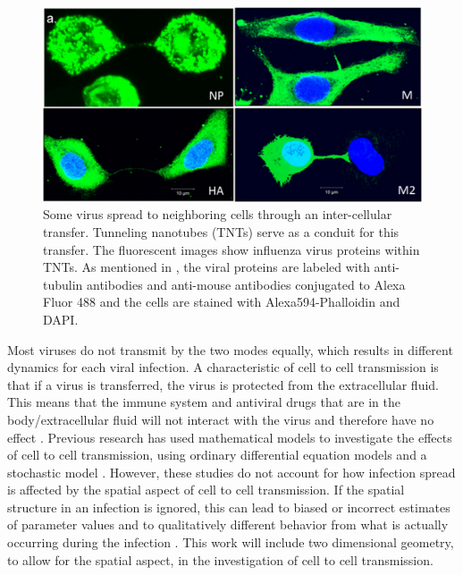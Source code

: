 \documentclass[a4paper]{article}
\begin{document}
\begin{figure}[h]
    \centering
    \includegraphics[width=0.8\linewidth]{Figures/cell2cell.pdf}
    \caption{Some virus spread to neighboring cells through an inter-cellular transfer. Tunneling nanotubes (TNTs) serve as a conduit for this transfer. The fluorescent images show influenza virus proteins within TNTs. As mentioned in \cite{cell2cell}, the viral proteins are labeled with anti-tubulin antibodies and anti-mouse antibodies conjugated to Alexa Fluor 488 and the cells are stained with Alexa594-Phalloidin and DAPI.}
    \label{fig:cell2cell}
\end{figure}

Most viruses do not transmit by the two modes equally, which results in different dynamics for each viral infection. A characteristic of cell to cell transmission is that if a virus is transferred, the virus is protected from the extracellular fluid. This means that the immune system and antiviral drugs that are in the body/extracellular fluid will not interact with the virus and therefore have no effect \cite{Allen}. Previous research has used mathematical models to investigate the effects of cell to cell transmission, using ordinary differential equation models \cite{Allen, Wang, Pourbashash} and a stochastic model \cite{Allen}. However, these studies do not account for how infection spread is affected by the spatial aspect of cell to cell transmission. If the spatial structure in an infection is ignored, this can lead to biased or incorrect estimates of parameter values and to qualitatively different behavior from what is actually occurring during the infection \cite{Gallagher}. This work will include two dimensional geometry, to allow for the spatial aspect, in the investigation of cell to cell transmission.
\end{document}
